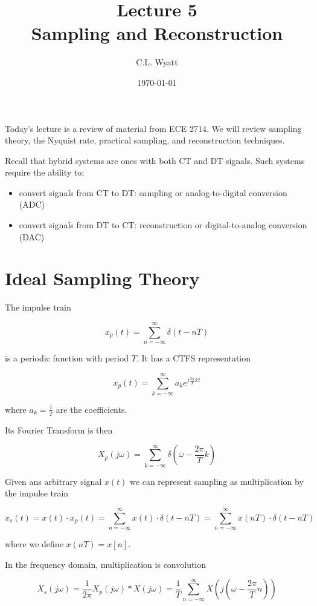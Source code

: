 \documentclass{article}
\begin{document}
\title{Lecture 5\\ Sampling and Reconstruction}
\author{C.L. Wyatt}
\date{\today}
\maketitle

Today's lecture is a review of material from ECE 2714. We will review sampling theory, the Nyquist rate, practical sampling, and reconstruction techniques.

Recall that hybrid systems are ones with both CT and DT signals. Such systems require the ability to:

\begin{itemize}
\item convert signals from CT to DT: sampling or analog-to-digital conversion (ADC)
\item convert signals from DT to CT: reconstruction or digital-to-analog conversion (DAC)
\end{itemize}

\section{Ideal Sampling Theory}

The impulse train

$$
x_p(t) = \sum\limits_{n = -\infty}^{\infty} \delta(t-nT)
$$

is a periodic function with period $T$. It has a CTFS representation

$$
x_p(t) = \sum\limits_{k = -\infty}^{\infty} a_k e^{j\frac{2\pi}{T} k t}
$$

where $a_k = \frac{1}{T}$ are the coefficients.

Its Fourier Transform is then

$$
X_p(j\omega) = \sum\limits_{k = -\infty}^{\infty} \delta\left(\omega-\frac{2\pi}{T} k\right)
$$

Given ans arbitrary signal $x(t)$ we can represent sampling as multiplication by the impulse train

$$
  x_s(t) = x(t)\cdot x_p(t)
  = \sum\limits_{n = -\infty}^{\infty} x(t)\cdot\delta(t-nT)
  = \sum\limits_{n = -\infty}^{\infty} x(nT)\cdot\delta(t-nT)
$$

where we define $x(nT) = x[n]$.

In the frequency domain, multiplication is convolution

$$
X_s(j\omega) = \frac{1}{2\pi} X_p(j\omega)*X(j\omega) = \frac{1}{T} \sum\limits_{n = -\infty}^{\infty} X\left(j\left(\omega - \frac{2\pi}{T} n \right) \right)
$$
\end{document}
